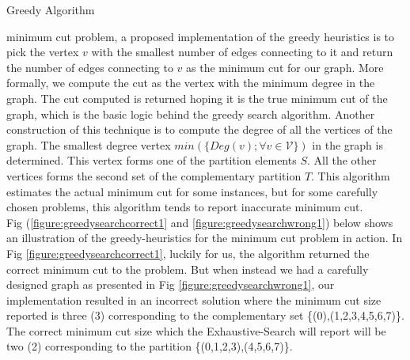 \documentclass[longpaper, english, final, times]{revdetua}
\begin{document}
		\begin{algorithm}
			\caption{Greedy Algorithm}
			\label{algorithm:GreedyAlgorithm}
			\DontPrintSemicolon
			
			
			
		\end{algorithm}
		
		minimum cut problem, a proposed implementation of the greedy heuristics is to pick the vertex $v$ with the smallest number of edges connecting to it and return the number of edges connecting to $v$ as the minimum cut for our graph. More formally, we compute the cut as the vertex with the minimum degree in the graph. The cut computed is returned hoping it is the true minimum cut of the graph, which is the basic logic behind the greedy search algorithm. Another construction of this technique is to compute the degree of all the vertices of the graph. The smallest degree vertex $min(\{Deg(v); \forall v \in \mathcal{V}\})$ in the graph is determined. This vertex forms one of the partition elements $S$. All the other vertices forms the second set of the complementary partition $T$. This algorithm estimates the actual minimum cut for some instances, but for some carefully chosen problems, this algorithm tends to report inaccurate minimum cut.\\
		
		Fig (\ref{figure:greedysearchcorrect1} and \ref{figure:greedysearchwrong1}) below shows an illustration of the greedy-heuristics for the minimum cut problem in action. In Fig \ref{figure:greedysearchcorrect1}, luckily for us, the algorithm returned the correct minimum cut to the problem. But when instead we  had a carefully designed graph as presented in Fig \ref{figure:greedysearchwrong1}, our implementation resulted in an incorrect solution where the minimum cut size reported is three (3) corresponding to the complementary set \{(0),(1,2,3,4,5,6,7)\}. The correct minimum cut size which the Exhaustive-Search will report will be two (2) corresponding to the partition \{(0,1,2,3),(4,5,6,7)\}.\\
		
\end{document}
